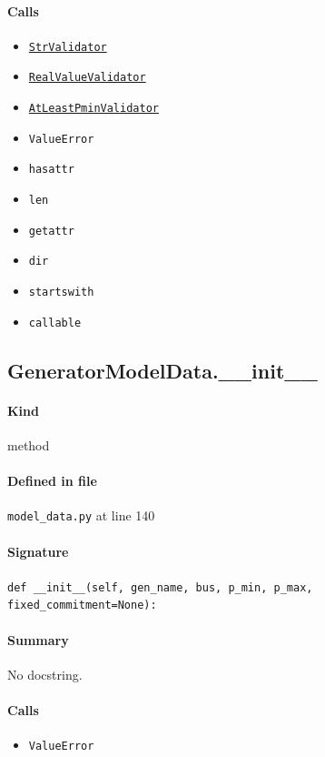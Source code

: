 \documentclass[11pt]{report}
\begin{document}
\paragraph{Calls}
\begin{itemize}[leftmargin=*]
  \item \hyperref[def:model_data.py:StrValidator:L49]{\texttt{StrValidator}}
  \item \hyperref[def:model_data.py:RealValueValidator:L58]{\texttt{RealValueValidator}}
  \item \hyperref[def:model_data.py:AtLeastPminValidator:L97]{\texttt{AtLeastPminValidator}}
  \item \texttt{ValueError}
  \item \texttt{hasattr}
  \item \texttt{len}
  \item \texttt{getattr}
  \item \texttt{dir}
  \item \texttt{startswith}
  \item \texttt{callable}
\end{itemize}
\subsection{GeneratorModelData.\_\_init\_\_}
\label{def:model_data.py:GeneratorModelData.__init__:L140}
\paragraph{Kind} method
\paragraph{Defined in file} \texttt{model\_data.py} at line 140
\paragraph{Signature} \texttt{def \_\_init\_\_(self, gen\_name, bus, p\_min, p\_max, fixed\_commitment=None):}
\paragraph{Summary} No docstring.
\paragraph{Calls}
\begin{itemize}[leftmargin=*]
  \item \texttt{ValueError}
\end{itemize}
\end{document}
